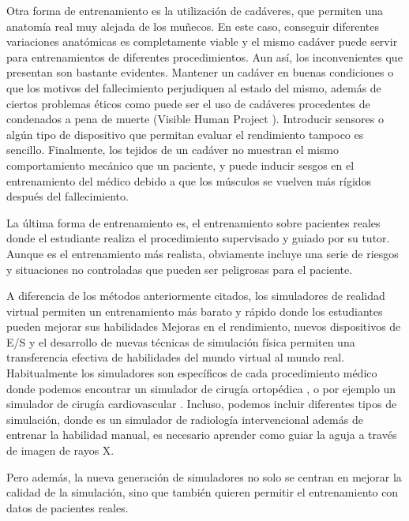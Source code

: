 Otra forma de entrenamiento es la utilización de cadáveres\cite{Tsui2007}, que permiten una anatomía real muy alejada de los muñecos. En este caso, conseguir diferentes variaciones anatómicas es completamente viable y el mismo cadáver puede servir para entrenamientos de diferentes procedimientos. Aun así, los inconvenientes que presentan son bastante evidentes. Mantener un cadáver en buenas condiciones o que los motivos del fallecimiento perjudiquen al estado del mismo, además de ciertos problemas éticos como puede ser el uso de cadáveres procedentes de condenados a pena de muerte (Visible Human Project \cite{ackerman1998visible}). Introducir sensores o algún tipo de dispositivo que permitan evaluar el rendimiento tampoco es sencillo. Finalmente, los tejidos de un cadáver no muestran el mismo comportamiento mecánico que un paciente, y puede inducir sesgos en el entrenamiento del médico debido a que los músculos se vuelven más rígidos después del fallecimiento.


La última forma de entrenamiento es, el entrenamiento sobre pacientes reales donde el estudiante realiza el procedimiento supervisado y guiado por su tutor. Aunque es el entrenamiento más realista, obviamente incluye una serie de riesgos y situaciones no controladas que pueden ser peligrosas para el paciente.


A diferencia de los métodos anteriormente citados, los simuladores de realidad virtual permiten un entrenamiento más barato y rápido donde los estudiantes pueden mejorar sus habilidades\new{:} Mejoras en el rendimiento, nuevos dispositivos de \ac{E/S} y el desarrollo de nuevas técnicas de simulación física\del{,} permiten una transferencia efectiva de habilidades del mundo virtual al mundo real. Habitualmente los simuladores  son específicos de cada procedimiento médico donde podemos encontrar un simulador de cirugía ortopédica \cite{cecil2017advanced}, o por ejemplo un simulador de cirugía cardiovascular \cite{korzeniowski2018vcsim3}. Incluso, podemos incluir diferentes tipos de simulación, donde \cite{villard2014interventional} es un simulador de radiología intervencional   además de entrenar la habilidad manual, es necesario aprender como guiar la aguja a través de imagen de rayos X.

Pero además, la nueva generación de simuladores no solo se centran en mejorar la calidad de la simulación, sino que también quieren permitir el entrenamiento con datos de pacientes reales\cite{Willaert2012,  Votta2013}. 






